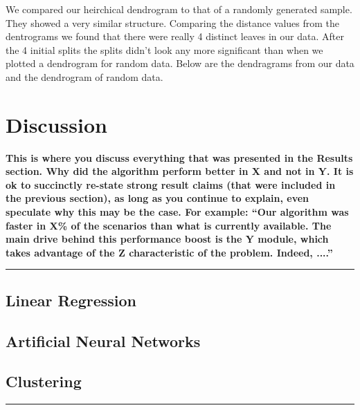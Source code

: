 \documentclass[12pt]{article}
\newcommand{\horizontalLine}{
	\begin{center}
		\hrule width 1.0\textwidth
	\end{center}
}
\newcommand{\smallHorizontalLine}{
    \begin{center}
        \hrule width 0.5\textwidth
    \end{center}}
\begin{document}
We compared our heirchical dendrogram to that of a randomly generated sample. They showed a very similar structure. Comparing the distance values from the dentrograms we found that there were really 4 distinct leaves in our data. After the 4 initial splits the splits didn't look any more significant than when we plotted a dendrogram for random data. Below are the dendragrams from our data and the dendrogram of random data.



\section{Discussion}
\label{sec:discussion}
\textbf{This is where you discuss everything that was presented in the Results section.
    Why did the algorithm perform better in X and not in Y. It is ok to succinctly re-state strong
    result claims (that were included in the previous section), as long as you continue to explain,
    even speculate why this may be the case. For example: \textquotedblleft Our algorithm was faster in X\% of the
    scenarios than what is currently available. The main drive behind this performance boost is the Y module, which takes advantage of the Z characteristic of the problem. Indeed, ....\textquotedblright}
\smallHorizontalLine

\subsection{Linear Regression}
\label{subsec:linearRegressionDisc}

\subsection{Artificial Neural Networks}
\label{subsec:annDisc}

\subsection{Clustering}
\label{subsec:clusteringDisc}

\horizontalLine
\end{document}
